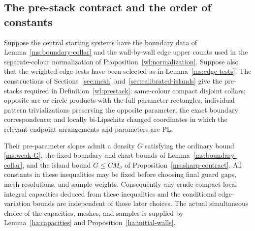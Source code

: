 \subsection{The pre-stack contract and the order of constants}

\begin{proposition}
\label{ms:prestacks}
Suppose the central starting systems have the boundary data of
Lemma~\ref{ms:boundary-collar} and the wall-by-wall edge upper counts
used in the separate-colour normalization of
Proposition~\ref{wl:normalization}.  Suppose also that the weighted edge tests
have been selected as in Lemma~\ref{ms:edge-tests}.  The constructions
of Sections~\ref{sec:mesh} and~\ref{sec:calibrated-islands} give the
pre-stacks required in
Definition~\ref{wl:prestack}: same-colour compact disjoint collars; opposite
arc or circle products with the full parameter rectangles;
individual pattern trivializations preserving the opposite
parameter; the exact boundary correspondence; and locally
bi-Lipschitz changed coordinates in which the relevant endpoint
arrangements and parameters are PL.

Their pre-parameter slopes admit a density $G$ satisfying the
ordinary bound \eqref{ms:weak-G}, the fixed boundary and chart
bounds of Lemma~\ref{ms:boundary-collar}, and the island bound
$G\le CM_\sigma$ of Proposition~\ref{ms:sharp-contract}.  All constants in
these inequalities may be fixed before choosing final guard
gaps, mesh resolutions, and sample weights.  Consequently any
crude compact-local integral capacities deduced from these
inequalities and the conditional edge-variation bounds are
independent of those later choices.  The actual simultaneous
choice of the capacities, meshes, and samples is supplied by
Lemma~\ref{ha:capacities} and Proposition~\ref{ha:initial-walls}.
\end{proposition}

